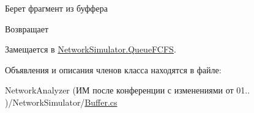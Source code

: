 Берет фрагмент из буффера 

\begin{DoxyReturn}{Возвращает}

\end{DoxyReturn}


Замещается в \hyperlink{class_network_simulator_1_1_queue_f_c_f_s_aa3b80a41b3c15339131d7de216b02a2b}{Network\+Simulator.\+Queue\+F\+C\+FS}.



Объявления и описания членов класса находятся в файле\+:\begin{DoxyCompactItemize}
\item 
Network\+Analyzer (ИМ после конференции  с изменениями от 01.. )/\+Network\+Simulator/\hyperlink{_buffer_8cs}{Buffer.\+cs}\end{DoxyCompactItemize}
